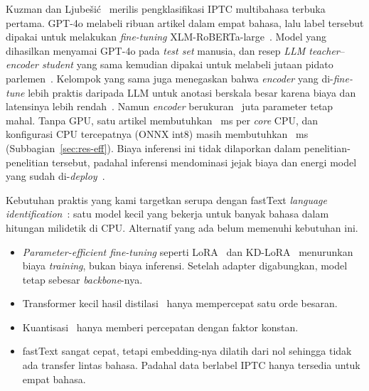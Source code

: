 \documentclass[journal]{IEEEtran}
\newcommand{\eng}[1]{\textit{#1}}   %
\begin{document}
Kuzman dan Ljube\v{s}i\'c~\cite{kuzman2025llm} merilis pengklasifikasi IPTC multibahasa terbuka pertama. GPT-4o melabeli ribuan artikel dalam empat bahasa, lalu label tersebut dipakai untuk melakukan \eng{fine-tuning} XLM-RoBERTa-large~\cite{conneau2020xlmr}. Model yang dihasilkan menyamai GPT-4o pada \eng{test set} manusia, dan resep \eng{LLM teacher}--\eng{encoder student} yang sama kemudian dipakai untuk melabeli jutaan pidato parlemen~\cite{kuzmanpungersek2026parlacap}. Kelompok yang sama juga menegaskan bahwa \eng{encoder} yang di-\eng{fine-tune} lebih praktis daripada LLM untuk anotasi berskala besar karena biaya dan latensinya lebih rendah~\cite{kuzman2025southslavic,kuzman2023genre}. Namun \eng{encoder} berukuran ~juta parameter tetap mahal. Tanpa GPU, satu artikel membutuhkan ~ms per \eng{core} CPU, dan konfigurasi CPU tercepatnya (ONNX int8) masih membutuhkan ~ms (Subbagian~\ref{sec:res-eff}). Biaya inferensi ini tidak dilaporkan dalam penelitian-penelitian tersebut, padahal inferensi mendominasi jejak biaya dan energi model yang sudah di-\eng{deploy}~\cite{luccioni2024power,treviso2023efficient}.

Kebutuhan praktis yang kami targetkan serupa dengan fastText \eng{language identification}~\cite{joulin2017bag}: satu model kecil yang bekerja untuk banyak bahasa dalam hitungan milidetik di CPU. Alternatif yang ada belum memenuhi kebutuhan ini.
\begin{itemize}
  \item \eng{Parameter-efficient fine-tuning} seperti LoRA~\cite{hu2022lora,razuvayevskaya2024peft} dan KD-LoRA~\cite{azimi2024kdlora} menurunkan biaya \eng{training}, bukan biaya inferensi. Setelah adapter digabungkan, model tetap sebesar \eng{backbone}-nya.
  \item Transformer kecil hasil distilasi~\cite{wang2021minilmv2,jiao2020tinybert} hanya mempercepat satu orde besaran.
  \item Kuantisasi~\cite{yao2022zeroquant} hanya memberi percepatan dengan faktor konstan.
  \item fastText sangat cepat, tetapi embedding-nya dilatih dari nol sehingga tidak ada transfer lintas bahasa. Padahal data berlabel IPTC hanya tersedia untuk empat bahasa.
\end{itemize}
\end{document}

